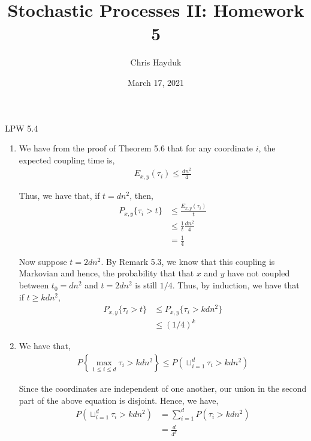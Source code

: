 \documentclass[12pt]{article}
\newenvironment{problem}[2][Problem]{\begin{trivlist}
\item[\hskip \labelsep {\bfseries #1}\hskip \labelsep {\bfseries #2.}]}{\end{trivlist}}
\begin{document}
\title{Stochastic Processes II: Homework 5}

\author{Chris Hayduk}
\date{March 17, 2021}

\maketitle

\begin{problem}{I}
LPW 5.4
\end{problem}

\begin{enumerate}[label=\alph*)]

\item We have from the proof of Theorem 5.6 that for any coordinate $i$, the expected coupling time is,
\begin{align*}
E_{x, y}(\tau_i) \leq \frac{dn^2}{4}
\end{align*}

Thus, we have that, if $t = dn^2$, then,
\begin{align*}
P_{x, y}\{\tau_i > t\} &\leq \frac{E_{x, y}(\tau_i)}{t}\\
&\leq \frac{1}{t} \frac{dn^2}{4}\\
&= \frac{1}{4}
\end{align*}

Now suppose $t = 2dn^2$. By Remark 5.3, we know that this coupling is Markovian and hence, the probability that that $x$ and $y$ have not coupled between $t_0 = dn^2$ and $t = 2dn^2$ is still $1/4$. Thus, by induction, we have that if $t \geq kdn^2$,
\begin{align*}
P_{x, y}\{\tau_i > t\} &\leq P_{x, y}\{\tau_i > kdn^2\}\\
&\leq (1/4)^k
\end{align*}

\item We have that,
\begin{align*}
P\left\{\max_{1 \leq i \leq d} \tau_i > kdn^2\right\} \leq P\left(\sqcup_{i=1}^d \tau_i > kdn^2\right)
\end{align*}

Since the coordinates are independent of one another, our union in the second part of the above equation is disjoint. Hence, we have,
\begin{align*}
P\left(\sqcup_{i=1}^d \tau_i > kdn^2\right) &= \sum_{i=1}^d P\left(\tau_i > kdn^2\right)\\
&= \frac{d}{4^k}
\end{align*}


\end{enumerate}
\end{document}

